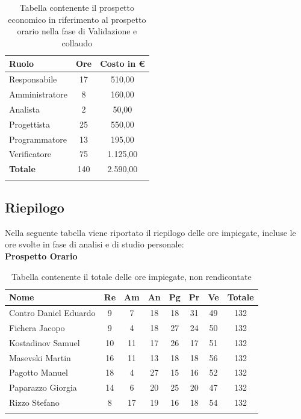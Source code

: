 \documentclass[../piano_di_progetto.tex]{subfiles}
\begin{document}
\begin{center}
	\begin{longtable}{|l|c|c|}
		\hline
		\rowcolor{lightgray}
		\textbf{Ruolo} & \textbf{Ore} & \textbf{Costo in €}\\

		\hline
		Responsabile & 17 & 510,00\\
		Amministratore & 8 & 160,00\\
		Analista & 2 & 50,00\\
		Progettista & 25 & 550,00\\
		Programmatore & 13 & 195,00\\
		Verificatore & 75 & 1.125,00\\
		\hline
		\textbf{Totale} & 140 & 2.590,00\\
		\hline
		\caption{Tabella contenente il prospetto economico in riferimento al prospetto orario nella fase di Validazione e collaudo}
	\end{longtable}
\end{center}

\newpage

\subsection{Riepilogo}%
\label{sub:riepilog}
Nella seguente tabella viene riportato il riepilogo delle ore impiegate, incluse le ore svolte in fase di analisi e di studio personale: \\

\textbf{Prospetto Orario}

\begin{center}
	\begin{longtable}{|l|c|c|c|c|c|c|c|}
		\hline
		\rowcolor{lightgray}
		\textbf{Nome} & \textbf{Re} & \textbf{Am} & \textbf{An} & \textbf{Pg}  & \textbf{Pr}   & \textbf{Ve} & \textbf{Totale} \\

		\hline
			Contro Daniel Eduardo & 9 & 7 & 18 & 18 & 31 & 49 & 132 \\
			Fichera Jacopo & 9 & 4 & 18 & 27 & 24 & 50 & 132 \\
			Kostadinov Samuel & 10 & 11 & 17 & 26 & 17 & 51 & 132 \\
			Masevski Martin & 16 & 11 & 13 & 18 & 18 & 56 & 132 \\
			Pagotto Manuel & 18 & 4 & 27 & 15 & 16 & 52 & 132 \\			
			Paparazzo Giorgia & 14 & 6 & 20 & 25 & 20 & 47 & 132 \\
			Rizzo Stefano & 8 & 17 & 19 & 16 & 18 & 54 & 132 \\
		\hline	
		\rowcolor{white}
		\caption{Tabella contenente il totale delle ore impiegate, non rendicontate}
	\end{longtable}
\end{center}
\end{document}
